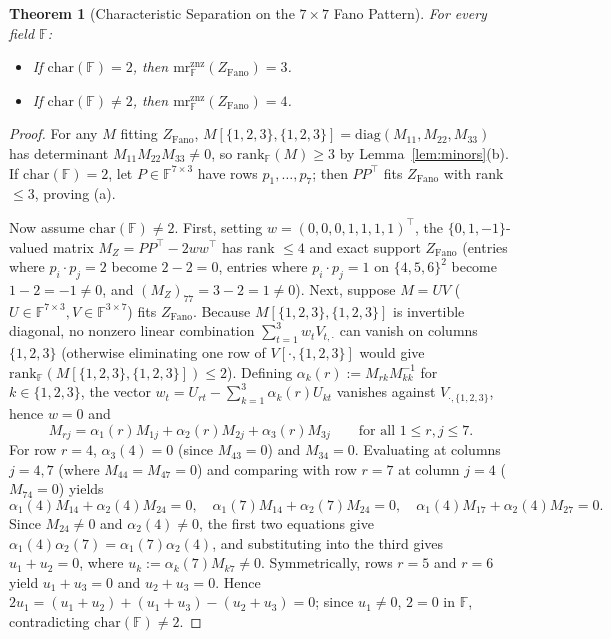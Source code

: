 \documentclass[11pt]{article}
\newtheorem{theorem}{Theorem}[section]
\theoremstyle{definition}
\newcommand{\F}{\mathbb{F}}
\newcommand{\mr}{\mathrm{mr}}
\newcommand{\rk}{\mathrm{rank}}
\begin{document}
\begin{theorem}[Characteristic Separation on the $7\times 7$ Fano Pattern]\label{thm:fano}
For every field $\F$:
\begin{itemize}
\item[(a)] If $\mathrm{char}(\F) = 2$, then $\mr_{\F}^{\mathrm{znz}}(Z_{\mathrm{Fano}}) = 3$.
\item[(b)] If $\mathrm{char}(\F) \neq 2$, then $\mr_{\F}^{\mathrm{znz}}(Z_{\mathrm{Fano}}) = 4$.
\end{itemize}
\end{theorem}
\begin{proof}
For any $M$ fitting $Z_{\mathrm{Fano}}$, $M[\{1,2,3\},\{1,2,3\}] = \mathrm{diag}(M_{11},M_{22},M_{33})$ has determinant $M_{11}M_{22}M_{33}\neq 0$, so $\rk_{\F}(M) \ge 3$ by Lemma~\ref{lem:minors}(b). If $\mathrm{char}(\F)=2$, let $P \in \F^{7\times 3}$ have rows $p_1,\dots,p_7$; then $P P^\top$ fits $Z_{\mathrm{Fano}}$ with rank $\le 3$, proving (a).

Now assume $\mathrm{char}(\F)\neq 2$. First, setting $w = (0,0,0,1,1,1,1)^\top$, the $\{0,1,-1\}$-valued matrix $M_Z = P P^\top - 2 w w^\top$ has rank $\le 4$ and exact support $Z_{\mathrm{Fano}}$ (entries where $p_i\cdot p_j = 2$ become $2-2=0$, entries where $p_i\cdot p_j = 1$ on $\{4,5,6\}^2$ become $1-2=-1\neq 0$, and $(M_Z)_{77} = 3-2=1\neq 0$). Next, suppose $M = U V$ ($U\in\F^{7\times 3}, V\in\F^{3\times 7}$) fits $Z_{\mathrm{Fano}}$. Because $M[\{1,2,3\},\{1,2,3\}]$ is invertible diagonal, no nonzero linear combination $\sum_{t=1}^3 w_t V_{t,\cdot}$ can vanish on columns $\{1,2,3\}$ (otherwise eliminating one row of $V[\cdot,\{1,2,3\}]$ would give $\rk_{\F}(M[\{1,2,3\},\{1,2,3\}])\le 2$). Defining $\alpha_k(r) := M_{rk} M_{kk}^{-1}$ for $k\in\{1,2,3\}$, the vector $w_t = U_{rt} - \sum_{k=1}^3 \alpha_k(r) U_{kt}$ vanishes against $V_{\cdot,\{1,2,3\}}$, hence $w = 0$ and
\[
M_{rj} = \alpha_1(r) M_{1j} + \alpha_2(r) M_{2j} + \alpha_3(r) M_{3j} \qquad \text{for all } 1 \le r,j \le 7.
\]
For row $r=4$, $\alpha_3(4)=0$ (since $M_{43}=0$) and $M_{34}=0$. Evaluating at columns $j=4,7$ (where $M_{44}=M_{47}=0$) and comparing with row $r=7$ at column $j=4$ ($M_{74}=0$) yields
\[
\alpha_1(4) M_{14} + \alpha_2(4) M_{24} = 0, \quad
\alpha_1(7) M_{14} + \alpha_2(7) M_{24} = 0, \quad
\alpha_1(4) M_{17} + \alpha_2(4) M_{27} = 0.
\]
Since $M_{24}\neq 0$ and $\alpha_2(4)\neq 0$, the first two equations give $\alpha_1(4)\alpha_2(7) = \alpha_1(7)\alpha_2(4)$, and substituting into the third gives $u_1 + u_2 = 0$, where $u_k := \alpha_k(7) M_{k7} \neq 0$. Symmetrically, rows $r=5$ and $r=6$ yield $u_1 + u_3 = 0$ and $u_2 + u_3 = 0$. Hence $2 u_1 = (u_1+u_2)+(u_1+u_3)-(u_2+u_3) = 0$; since $u_1\neq 0$, $2 = 0$ in $\F$, contradicting $\mathrm{char}(\F)\neq 2$.
\end{proof}
\end{document}
